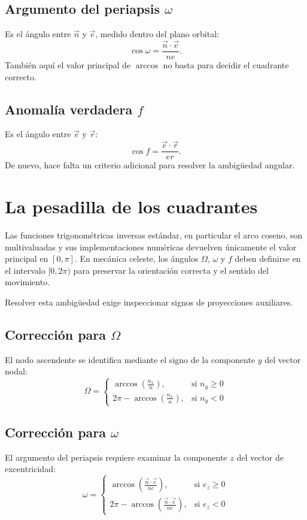 \subsection{Argumento del periapsis \texorpdfstring{$\omega$}{omega}}
Es el ángulo entre \(\vec{n}\) y \(\vec{e}\), medido dentro del plano orbital:
\[
 \cos\omega = \frac{\vec{n} \cdot \vec{e}}{ne}.
\]
También aquí el valor principal de \(\arccos\) no basta para decidir el cuadrante correcto.

\subsection{Anomalía verdadera \texorpdfstring{$f$}{f}}
Es el ángulo entre \(\vec{e}\) y \(\vec{r}\):
\[
 \cos f = \frac{\vec{e} \cdot \vec{r}}{er}.
\]
De nuevo, hace falta un criterio adicional para resolver la ambigüedad angular.

\section{La pesadilla de los cuadrantes}
Las funciones trigonométricas inversas estándar, en particular el arco coseno, son multivaluadas y sus implementaciones numéricas devuelven únicamente el valor principal en \([0,\pi]\). En mecánica celeste, los ángulos \(\Omega\), \(\omega\) y \(f\) deben definirse en el intervalo \([0,2\pi)\) para preservar la orientación correcta y el sentido del movimiento.

Resolver esta ambigüedad exige inspeccionar signos de proyecciones auxiliares.

\subsection{Corrección para \texorpdfstring{$\Omega$}{Omega}}
El nodo ascendente se identifica mediante el signo de la componente \(y\) del vector nodal:
\[
 \Omega =
\begin{cases}
\arccos\left(\frac{n_x}{n}\right), & \text{si } n_y \ge 0 \\
2\pi - \arccos\left(\frac{n_x}{n}\right), & \text{si } n_y < 0
\end{cases}
\]

\subsection{Corrección para \texorpdfstring{$\omega$}{omega}}
El argumento del periapsis requiere examinar la componente \(z\) del vector de excentricidad:
\[
 \omega =
\begin{cases}
\arccos\left(\frac{\vec{n} \cdot \vec{e}}{ne}\right), & \text{si } e_z \ge 0 \\
2\pi - \arccos\left(\frac{\vec{n} \cdot \vec{e}}{ne}\right), & \text{si } e_z < 0
\end{cases}
\]

